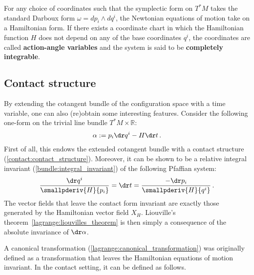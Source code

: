     For any choice of coordinates such that the symplectic form on $T^*M$ takes the standard Darboux form $\omega=dp_i\wedge dq^i$, the Newtonian equations of motion take on a Hamiltonian form. If there exists a coordinate chart in which the Hamiltonian function $H$ does not depend on any of the base coordinates $q^i$, the coordinates are called \textbf{action-angle variables} and the system is said to be \textbf{completely integrable}.

\subsection{Contact structure}

    By extending the cotangent bundle of the configuration space with a time variable, one can also (re)obtain some interesting features. Consider the following one-form on the trivial line bundle $T^*M\times\mathbb{R}$:
    \begin{gather}
        \alpha := p_i\dr q^i - H\dr t\,.
    \end{gather}
    First of all, this endows the extended cotangent bundle with a contact structure (\cref{contact:contact_structure}). Moreover, it can be shown to be a relative integral invariant (\cref{bundle:integral_invariant}) of the following Pfaffian system:
    \begin{gather}
        \frac{\dr q^i}{\smallpderiv{H}{p_i}} = \dr t = \frac{-\dr p_i}{\smallpderiv{H}{q^i}}\,.
    \end{gather}
    The vector fields that leave the contact form invariant are exactly those generated by the Hamiltonian vector field $X_H$. Liouville's theorem~\ref{lagrange:liouvilles_theorem} is then simply a consequence of the absolute invariance of $\dr\alpha$.

    A canonical transformation (\cref{lagrange:canonical_transformation}) was originally defined as a transformation that leaves the Hamiltonian equations of motion invariant. In the contact setting, it can be defined as follows.

